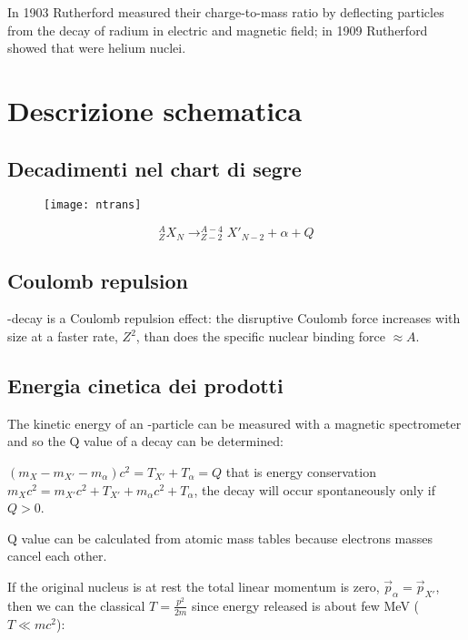 In 1903 Rutherford measured their charge-to-mass ratio by deflecting \Ra particles from the decay of radium in electric and magnetic field; in 1909 Rutherford showed that \Ra were helium nuclei.

\section{Descrizione schematica}

\subsection{Decadimenti nel chart di segre}

\begin{figure}[!ht]
\centering
\texttt{[image: ntrans]}
\label{fig:ntrans}
\end{figure}

\begin{equation*}
^A_ZX_N\rightarrow^{A-4}_{Z-2}X'_{N-2}+\alpha+Q
\end{equation*}

\subsection{Coulomb repulsion}
 \Ra-decay is a Coulomb repulsion effect: the disruptive Coulomb force increases with size at a faster rate, $Z^2$, than does the specific nuclear binding force $\approx A$.

\subsection{Energia cinetica dei prodotti}

The kinetic energy of an \Ra-particle can be measured with a magnetic spectrometer and so the Q value of a decay can be determined:

$(m_X-m_{X'}-m_{\alpha})c^2=T_{X'}+T_{\alpha}=Q$ that is energy conservation\\ $m_Xc^2=m_{X'}c^2+T_{X'}+m_{\alpha}c^2+T_{\alpha}$, the decay will occur spontaneously only if $Q>0$.

Q value can be calculated from atomic mass tables because electrons masses cancel each other.

If the original nucleus is at rest the total linear momentum is zero, $\vec{p}_{\alpha}=\vec{p}_{X'}$, then we can the classical $T=\frac{p^2}{2m}$ since energy released is about few MeV ($T\ll mc^2$):


